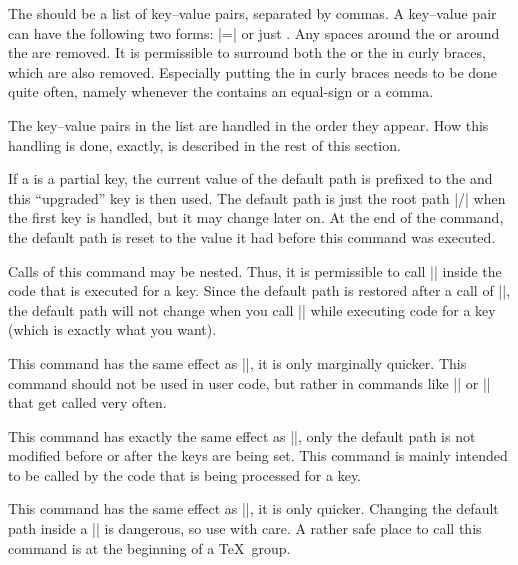 \begin{command}{\pgfkeys{}}
  The  should be a list of key--value pairs, separated
  by commas. A key--value pair can have the following two forms:
  |=| or just . Any spaces around the
   or around the  are removed. It is permissible
  to surround both the  or the  in curly braces,
  which are also removed. Especially putting the  in curly
  braces needs to be done quite often, namely whenever the 
  contains an equal-sign or a comma.

  The key--value pairs in the list are handled in the order they
  appear. How this handling is done, exactly, is described in the rest
  of this section.

  If a  is a partial key, the current value of the default
  path is prefixed to the  and this ``upgraded'' key is
  then used. The default path is just the root path |/| when the first
  key is handled, but it may change later on. At the end of the
  command, the default path is reset to the value it had before this
  command was executed.

  Calls of this command may be nested. Thus, it is permissible to call
  |\pgfkeys| inside the code that is executed for a key. Since the
  default path is restored after a call of |\pgfkeys|, the default
  path will not change when you call |\pgfkeys| while executing code
  for a key (which is exactly what you want).
\end{command}

\begin{command}{\pgfqkeys{}}
  This command has the same effect as ||, it is only marginally
  quicker. This command should not be used in user code, but rather in
  commands like |\tikzset| or |\pgfset| that get called very often.
\end{command}

\begin{command}{\pgfkeysalso{}}
  This command has exactly the same effect as |\pgfkeys|, only the
  default path is not modified before or after the keys are being
  set. This command is mainly intended to be called by the code that
  is being processed for a key.
\end{command}

\begin{command}{\pgfqkeysalso{}}
  This command has the same effect as ||, it is only quicker. Changing the
  default path inside a |\pgfkeyalso| is dangerous, so use with
  care. A rather safe place to call this command is at the beginning
  of a \TeX\ group.
\end{command}


